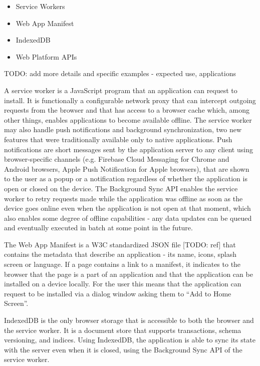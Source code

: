 \documentclass[english,odsaz]{fitthesis}
\begin{document}
\begin{itemize}
\item Service Workers
\item Web App Manifest
\item IndexedDB
\item Web Platform APIs
\end{itemize}

TODO: add more details and specific examples - expected use, applications

A service worker is a JavaScript program that an application can request to
install. It is functionally a configurable network proxy \cite{mdn_svcwrk} that can
intercept outgoing requests from the browser and that has access to a browser
cache which, among other things, enables applications to become available
offline. The service worker may also handle push notifications and background
synchronization, two new features that were traditionally available only to
native applications. Push notifications are short messages sent by the
application server to any client using browser-specific channels (e.g. Firebase
Cloud Messaging for Chrome and Android browsers, Apple Push Notification for
Apple browsers), that are shown to the user as a popup or a notification
regardless of whether the application is open or closed on the device. The
Background Sync API enables the service worker to retry requests made while
the application was offline as soon as the device goes online even when the
application is not open at that moment, which also enables some degree of
offline capabilities - any data updates can be queued and eventually executed in
batch at some point in the future.

The Web App Manifest is a W3C standardized JSON file [TODO: ref] that contains
the metadata that describe an application - its name, icons, splash screen or
language. If a page contains a link to a manifest, it indicates to the browser
that the page is a part of an application and that the application can be
installed on a device locally. For the user this means that the application can
request to be installed via a dialog window asking them to ``Add to Home Screen''.

IndexedDB is the only browser storage that is accessible to both the browser and
the service worker. It is a document store that supports transactions, schema
versioning, and indices. Using IndexedDB, the application is able to sync its
state with the server even when it is closed, using the Background Sync API of
the service worker.
\end{document}
